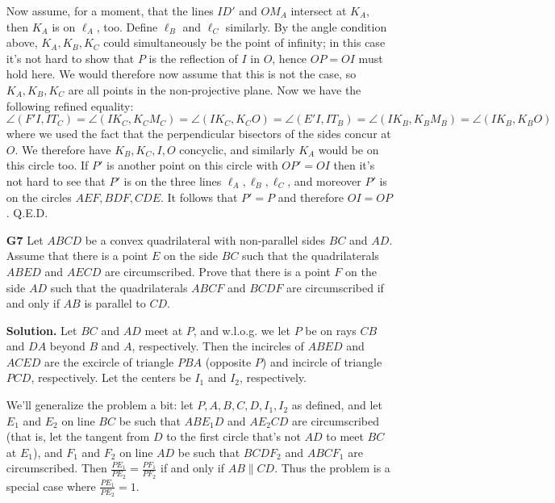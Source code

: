 \documentclass[11pt,a4paper]{article}
\begin{document}
\begin{enumerate}
	Now assume, for a moment, that the lines $ID'$ and $OM_A$ intersect at $K_A$, then $K_A$ is on $\ell_A$, too. Define $\ell_B$ and $\ell_C$ similarly. By the angle condition above, $K_A, K_B, K_C$ could simultaneously be the point of infinity; in this case it's not hard to show that $P$ is the reflection of $I$ in $O$, hence $OP=OI$ must hold here. We would therefore now assume that this is not the case, so $K_A, K_B, K_C$ are all points in the non-projective plane. 
	Now we have the following refined equality: 
	\[
	\angle(F'I, IT_C)=\angle(IK_C, K_CM_C) = \angle(IK_C, K_CO) = \angle(E'I, IT_B)=\angle(IK_B, K_BM_B)=\angle (IK_B, K_BO)
	\]
	where we used the fact that the perpendicular bisectors of the sides concur at $O$. 
	We therefore have $K_B, K_C, I, O$ concyclic, and similarly $K_A$ would be on this circle too. 
	If $P'$ is another point on this circle with $OP'=OI$ then it's not hard to see that $P'$ is on the three lines $\ell_A, \ell_B, \ell_C$, and moreover $P'$ is on the circles $AEF, BDF, CDE$. It follows that $P'=P$ and therefore $OI=OP$. Q.E.D. 
	
	\item[\textbf{G7}] Let $ABCD$ be a convex quadrilateral with non-parallel sides $BC$ and $AD$. Assume that there is a point $E$ on the side $BC$ such that the quadrilaterals $ABED$ and $AECD$ are circumscribed. Prove that there is a point $F$ on the side $AD$ such that the quadrilaterals $ABCF$ and $BCDF$ are circumscribed if and only if $AB$ is parallel to $CD$.
	
	\textbf{Solution.} Let $BC$ and $AD$ meet at $P$, and w.l.o.g. we let $P$ be on rays $CB$ and $DA$ beyond $B$ and $A$, respectively. Then the incircles of $ABED$ and $ACED$ are the excircle of triangle $PBA$ (opposite $P$) and incircle of triangle $PCD$, respectively. Let the centers be $I_1$ and $I_2$, respectively. 
	
	We'll generalize the problem a bit: let $P, A, B, C, D, I_1, I_2$ as defined, and let $E_1$ and $E_2$ on line $BC$ be such that $ABE_1D$ and $AE_2CD$ are circumscribed (that is, let the tangent from $D$ to the first circle that's not $AD$ to meet $BC$ at $E_1$), and $F_1$ and $F_2$ on line $AD$ be such that $BCDF_2$ and $ABCF_1$ are circumscribed. Then $\frac{PE_1}{PE_2}=\frac{PF_1}{PF_2}$ if and only if $AB\parallel CD$. Thus the problem is a special case where $\frac{PE_1}{PE_2}=1$. 
	

\end{enumerate}
\end{document}
